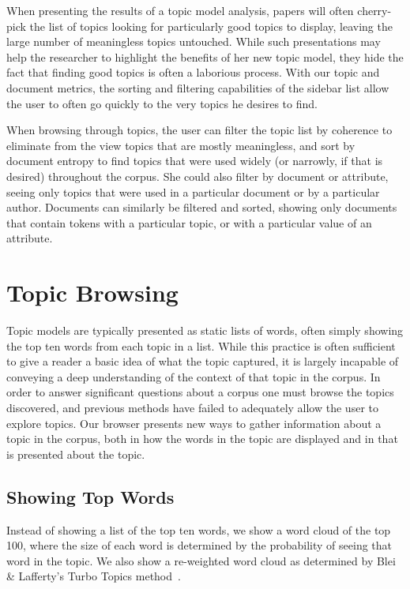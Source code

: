 \documentclass{article}
\begin{document}
When presenting the results of a topic model analysis, papers will often
cherry-pick the list of topics looking for particularly good topics to display,
leaving the large number of meaningless topics untouched.  While such
presentations may help the researcher to highlight the benefits of her new
topic model, they hide the fact that finding good topics is often a laborious
process.  With our topic and document metrics, the sorting and filtering
capabilities of the sidebar list allow the user to often go quickly to the very
topics he desires to find.

When browsing through topics, the user can filter the topic list by coherence
to eliminate from the view topics that are mostly meaningless, and sort by
document entropy to find topics that were used widely (or narrowly, if that is
desired) throughout the corpus.  She could also filter by document or
attribute, seeing only topics that were used in a particular document or by a
particular author.  Documents can similarly be filtered and sorted, showing
only documents that contain tokens with a particular topic, or with a
particular value of an attribute.

\section{Topic Browsing}

Topic models are typically presented as static lists of words, often simply
showing the top ten words from each topic in a list.  While this practice is
often sufficient to give a reader a basic idea of what the topic captured, it
is largely incapable of conveying a deep understanding of the context of that
topic in the corpus.  In order to answer significant questions about a corpus
one must browse the topics discovered, and previous methods have failed to
adequately allow the user to explore topics.  Our browser presents new ways
to gather information about a topic in the corpus, both in how the words in the
topic are displayed and in that is presented about the topic.

\subsection{Showing Top Words}

Instead of showing a list of the top ten words, we show a word cloud of the top
100, where the size of each word is determined by the probability of seeing
that word in the topic.  We also show a re-weighted word cloud as determined by
Blei \& Lafferty's Turbo Topics method~\cite{blei-2009-turbo-topics}.
\end{document}
